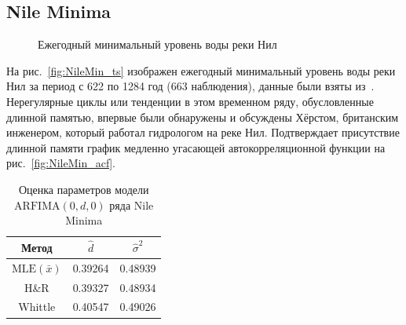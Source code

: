 \documentclass[specialist,
substylefile = spbu_report.rtx,
subf,href,colorlinks=true, 12pt]{disser}
\theoremstyle{definition}
\begin{document}
\subsection{Nile Minima}
\begin{figure}[h!]
	\centering
	\caption{Ежегодный минимальный уровень воды реки Нил}
\end{figure}

На рис.~\ref{fig:NileMin_ts} изображен ежегодный минимальный уровень воды реки Нил за период с 622 по 1284 год (663 наблюдения), данные были взяты из~\cite{Beran1994}. Нерегулярные циклы или тенденции в этом временном ряду, обусловленные длинной памятью, впервые были обнаружены и обсуждены Хёрстом, британским инженером, который работал гидрологом на реке Нил. Подтверждает присутствие длинной памяти график медленно угасающей автокорреляционной функции на рис.~\ref{fig:NileMin_acf}.

\begin{table}[t]
	\centering
	\caption{Оценка параметров модели $\mathrm{ARFIMA}(0, d, 0)$ ряда Nile Minima}
	\label{tab:NileMin_est}
	\begin{tabular}{|c|c|c|}
		\hline
		Метод                  & $\hat{d}$ & $\hat{\sigma}^2$ \\
		\hline
		$\mathrm{MLE}(\bar x)$ & 0.39264   & 0.48939          \\
		H\&R                   & 0.39327   & 0.48934          \\
		Whittle                & 0.40547   & 0.49026          \\
		\hline
	\end{tabular}
\end{table}
\end{document}
